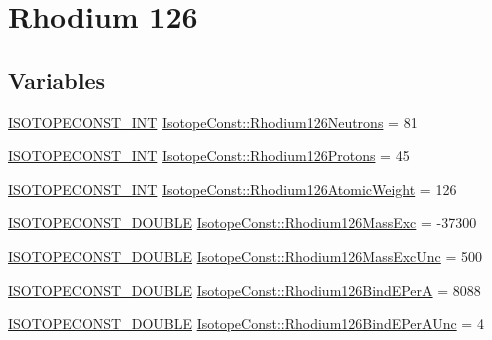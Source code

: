 \hypertarget{group___isotope_const-_rhodium-_rh126}{}\section{Rhodium 126}
\label{group___isotope_const-_rhodium-_rh126}
\subsection*{Variables}
\begin{DoxyCompactItemize}
\item 
\mbox{\hyperlink{group___isotope_const-_macros_ga5f18360b3e99483a35c32d789e62621c}{I\+S\+O\+T\+O\+P\+E\+C\+O\+N\+S\+T\+\_\+\+I\+NT}} \mbox{\hyperlink{group___isotope_const-_rhodium-_rh126_ga7178b375525288022ce5332b96385f9a}{Isotope\+Const\+::\+Rhodium126\+Neutrons}} = 81
\item 
\mbox{\hyperlink{group___isotope_const-_macros_ga5f18360b3e99483a35c32d789e62621c}{I\+S\+O\+T\+O\+P\+E\+C\+O\+N\+S\+T\+\_\+\+I\+NT}} \mbox{\hyperlink{group___isotope_const-_rhodium-_rh126_ga2c1ae54ecdd768258ec8f6c2241a1b90}{Isotope\+Const\+::\+Rhodium126\+Protons}} = 45
\item 
\mbox{\hyperlink{group___isotope_const-_macros_ga5f18360b3e99483a35c32d789e62621c}{I\+S\+O\+T\+O\+P\+E\+C\+O\+N\+S\+T\+\_\+\+I\+NT}} \mbox{\hyperlink{group___isotope_const-_rhodium-_rh126_ga3cedb57de1af13f3abf3233e9fdbeefc}{Isotope\+Const\+::\+Rhodium126\+Atomic\+Weight}} = 126
\item 
\mbox{\hyperlink{group___isotope_const-_macros_ga8f45a7272ce02c0b4c65c44636ed719a}{I\+S\+O\+T\+O\+P\+E\+C\+O\+N\+S\+T\+\_\+\+D\+O\+U\+B\+LE}} \mbox{\hyperlink{group___isotope_const-_rhodium-_rh126_ga1681e259f8b1eb24f65db3719f1f17ed}{Isotope\+Const\+::\+Rhodium126\+Mass\+Exc}} = -\/37300
\item 
\mbox{\hyperlink{group___isotope_const-_macros_ga8f45a7272ce02c0b4c65c44636ed719a}{I\+S\+O\+T\+O\+P\+E\+C\+O\+N\+S\+T\+\_\+\+D\+O\+U\+B\+LE}} \mbox{\hyperlink{group___isotope_const-_rhodium-_rh126_ga5ada64267936c7e32ba80e092edcf055}{Isotope\+Const\+::\+Rhodium126\+Mass\+Exc\+Unc}} = 500
\item 
\mbox{\hyperlink{group___isotope_const-_macros_ga8f45a7272ce02c0b4c65c44636ed719a}{I\+S\+O\+T\+O\+P\+E\+C\+O\+N\+S\+T\+\_\+\+D\+O\+U\+B\+LE}} \mbox{\hyperlink{group___isotope_const-_rhodium-_rh126_gabf6b7a7ddec91398e8215dab1916f90a}{Isotope\+Const\+::\+Rhodium126\+Bind\+E\+PerA}} = 8088
\item 
\mbox{\hyperlink{group___isotope_const-_macros_ga8f45a7272ce02c0b4c65c44636ed719a}{I\+S\+O\+T\+O\+P\+E\+C\+O\+N\+S\+T\+\_\+\+D\+O\+U\+B\+LE}} \mbox{\hyperlink{group___isotope_const-_rhodium-_rh126_ga840be42bac9445be971df86585ab584f}{Isotope\+Const\+::\+Rhodium126\+Bind\+E\+Per\+A\+Unc}} = 4

\end{DoxyCompactItemize}
